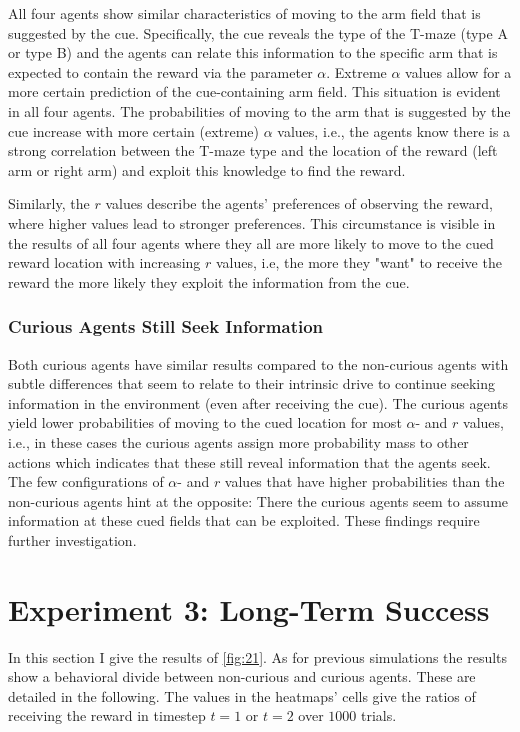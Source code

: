 All four agents show similar characteristics of moving to the arm field that is suggested by the cue. Specifically, the cue reveals the type of the T-maze (type A or type B) and the agents can relate this information to the specific arm that is expected to contain the reward via the parameter \(\alpha\). Extreme \(\alpha\) values allow for a more certain prediction of the cue-containing arm field. This situation is evident in all four agents. The probabilities of moving to the arm that is suggested by the cue increase with more certain (extreme) \(\alpha\) values, i.e., the agents know there is a strong correlation between the T-maze type and the location of the reward (left arm or right arm) and exploit this knowledge to find the reward.

Similarly, the \(r\) values describe the agents' preferences of observing the reward, where higher values lead to stronger preferences. This circumstance is visible in the results of all four agents where they all are more likely to move to the cued reward location with increasing \(r\) values, i.e, the more they "want" to receive the reward the more likely they exploit the information from the cue.

\subsubsection{Curious Agents Still Seek Information}

Both curious agents have similar results compared to the non-curious agents with subtle differences that seem to relate to their intrinsic drive to continue seeking information in the environment (even after receiving the cue). The curious agents yield lower probabilities of moving to the cued location for most \(\alpha\)- and \(r\) values, i.e., in these cases the curious agents assign more probability mass to other actions which indicates that these still reveal information that the agents seek. The few configurations of \(\alpha\)- and \(r\) values that have higher probabilities than the non-curious agents hint at the opposite: There the curious agents seem to assume information at these cued fields that can be exploited. These findings require further investigation.


\section{Experiment 3: Long-Term Success}


In this section I give the results of \cref{fig:21}. As for previous simulations the results show a behavioral divide between non-curious and curious agents. These are detailed in the following.
The values in the heatmaps' cells give the ratios of receiving the reward in timestep \(t=1\) or \(t=2\) over \(1000\) trials.

